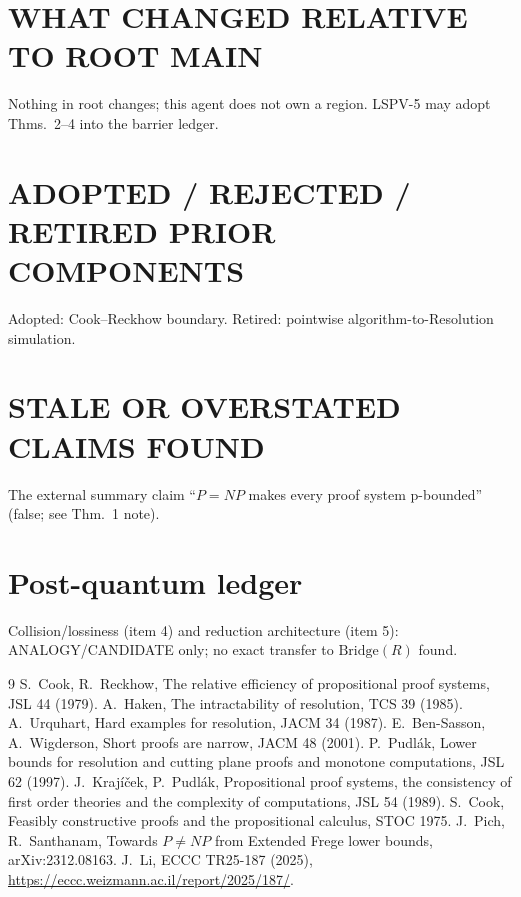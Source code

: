 \documentclass[11pt]{article}
\theoremstyle{definition}
\begin{document}
\section*{WHAT CHANGED RELATIVE TO ROOT MAIN}
Nothing in root  changes; this agent does not own a region. LSPV-5 may adopt
Thms.~2--4 into the barrier ledger.
\section*{ADOPTED / REJECTED / RETIRED PRIOR COMPONENTS}
Adopted: Cook--Reckhow boundary. Retired: pointwise algorithm-to-Resolution simulation.
\section*{STALE OR OVERSTATED CLAIMS FOUND}
The external summary claim ``$P=NP$ makes every proof system p-bounded'' (false; see Thm.~1 note).
\section*{Post-quantum ledger}
Collision/lossiness (item 4) and reduction architecture (item 5): ANALOGY/CANDIDATE only;
no exact transfer to $\mathrm{Bridge}(R)$ found.

\begin{thebibliography}{9}
 S.~Cook, R.~Reckhow, The relative efficiency of propositional proof systems, JSL 44 (1979).
 A.~Haken, The intractability of resolution, TCS 39 (1985).
 A.~Urquhart, Hard examples for resolution, JACM 34 (1987).
 E.~Ben-Sasson, A.~Wigderson, Short proofs are narrow, JACM 48 (2001).
 P.~Pudlák, Lower bounds for resolution and cutting plane proofs and monotone computations, JSL 62 (1997).
 J.~Krajíček, P.~Pudlák, Propositional proof systems, the consistency of first order theories and the complexity of computations, JSL 54 (1989).
 S.~Cook, Feasibly constructive proofs and the propositional calculus, STOC 1975.
 J.~Pich, R.~Santhanam, Towards $P\ne NP$ from Extended Frege lower bounds, arXiv:2312.08163.
 J.~Li, ECCC TR25-187 (2025), \url{https://eccc.weizmann.ac.il/report/2025/187/}.
\end{thebibliography}
\end{document}
